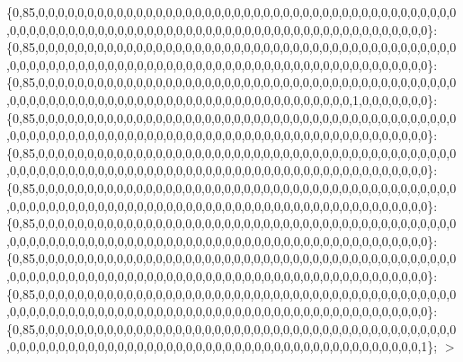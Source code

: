 \{0,85,0,0,0,0,0,0,0,0,0,0,0,0,0,0,0,0,0,0,0,0,0,0,0,0,0,0,0,0,0,0,0,0,0,0,0,0,0,0,0,0,0,0,0,0,0,0,0,0,0,0,0,0,0,0,0,0,0,0,0,0,0,0,0,0,0,0,0,0,0,0,0,0,0,0,0,0,0,0,0,0,0,0,0,0,0,0\}\+: \{0,85,0,0,0,0,0,0,0,0,0,0,0,0,0,0,0,0,0,0,0,0,0,0,0,0,0,0,0,0,0,0,0,0,0,0,0,0,0,0,0,0,0,0,0,0,0,0,0,0,0,0,0,0,0,0,0,0,0,0,0,0,0,0,0,0,0,0,0,0,0,0,0,0,0,0,0,0,0,0,0,0,0,0,0,0,0,0\}\+: \{0,85,0,0,0,0,0,0,0,0,0,0,0,0,0,0,0,0,0,0,0,0,0,0,0,0,0,0,0,0,0,0,0,0,0,0,0,0,0,0,0,0,0,0,0,0,0,0,0,0,0,0,0,0,0,0,0,0,0,0,0,0,0,0,0,0,0,0,0,0,0,0,0,0,0,0,0,0,0,0,1,0,0,0,0,0,0,0\}\+: \{0,85,0,0,0,0,0,0,0,0,0,0,0,0,0,0,0,0,0,0,0,0,0,0,0,0,0,0,0,0,0,0,0,0,0,0,0,0,0,0,0,0,0,0,0,0,0,0,0,0,0,0,0,0,0,0,0,0,0,0,0,0,0,0,0,0,0,0,0,0,0,0,0,0,0,0,0,0,0,0,0,0,0,0,0,0,0,0\}\+: \{0,85,0,0,0,0,0,0,0,0,0,0,0,0,0,0,0,0,0,0,0,0,0,0,0,0,0,0,0,0,0,0,0,0,0,0,0,0,0,0,0,0,0,0,0,0,0,0,0,0,0,0,0,0,0,0,0,0,0,0,0,0,0,0,0,0,0,0,0,0,0,0,0,0,0,0,0,0,0,0,0,0,0,0,0,0,0,0\}\+: \{0,85,0,0,0,0,0,0,0,0,0,0,0,0,0,0,0,0,0,0,0,0,0,0,0,0,0,0,0,0,0,0,0,0,0,0,0,0,0,0,0,0,0,0,0,0,0,0,0,0,0,0,0,0,0,0,0,0,0,0,0,0,0,0,0,0,0,0,0,0,0,0,0,0,0,0,0,0,0,0,0,0,0,0,0,0,0,0\}\+: \{0,85,0,0,0,0,0,0,0,0,0,0,0,0,0,0,0,0,0,0,0,0,0,0,0,0,0,0,0,0,0,0,0,0,0,0,0,0,0,0,0,0,0,0,0,0,0,0,0,0,0,0,0,0,0,0,0,0,0,0,0,0,0,0,0,0,0,0,0,0,0,0,0,0,0,0,0,0,0,0,0,0,0,0,0,0,0,0\}\+: \{0,85,0,0,0,0,0,0,0,0,0,0,0,0,0,0,0,0,0,0,0,0,0,0,0,0,0,0,0,0,0,0,0,0,0,0,0,0,0,0,0,0,0,0,0,0,0,0,0,0,0,0,0,0,0,0,0,0,0,0,0,0,0,0,0,0,0,0,0,0,0,0,0,0,0,0,0,0,0,0,0,0,0,0,0,0,0,0\}\+: \{0,85,0,0,0,0,0,0,0,0,0,0,0,0,0,0,0,0,0,0,0,0,0,0,0,0,0,0,0,0,0,0,0,0,0,0,0,0,0,0,0,0,0,0,0,0,0,0,0,0,0,0,0,0,0,0,0,0,0,0,0,0,0,0,0,0,0,0,0,0,0,0,0,0,0,0,0,0,0,0,0,0,0,0,0,0,0,0\}\+: \{0,85,0,0,0,0,0,0,0,0,0,0,0,0,0,0,0,0,0,0,0,0,0,0,0,0,0,0,0,0,0,0,0,0,0,0,0,0,0,0,0,0,0,0,0,0,0,0,0,0,0,0,0,0,0,0,0,0,0,0,0,0,0,0,0,0,0,0,0,0,0,0,0,0,0,0,0,0,0,0,0,0,0,0,0,0,0,1\}; $>$ 